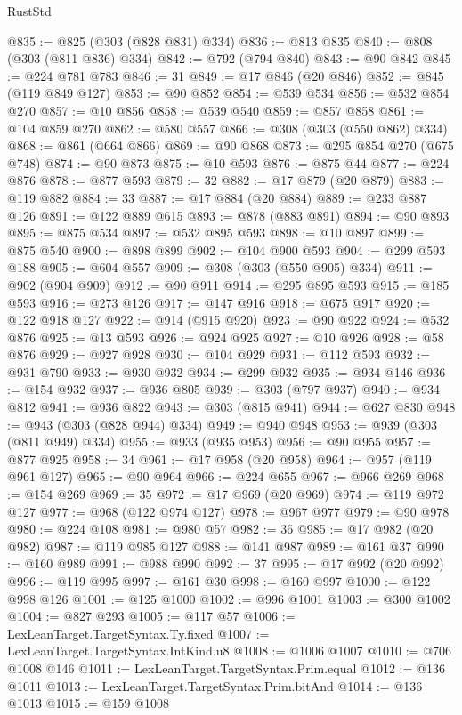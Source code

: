 \begin{lexlean}{RustStd}
\begin{coremodule}
{\begin{coremodule}
{{{{{{{{{{{{{{{{{{{{{{{{{{{{{{{{{{{{{{{{{{{{{{{{{{{{{{{{{{{{{{{{{{{{@835 := @825 (@303 (@828 @831) @334)
@836 := @813 @835
@840 := @808 (@303 (@811 @836) @334)
@842 := @792 (@794 @840)
@843 := @90 @842
@845 := @224 @781 @783
@846 := 31
@849 := @17 @846 (@20 @846)
@852 := @845 (@119 @849 @127)
@853 := @90 @852
@854 := @539 @534
@856 := @532 @854 @270
@857 := @10 @856
@858 := @539 @540
@859 := @857 @858
@861 := @104 @859 @270
@862 := @580 @557
@866 := @308 (@303 (@550 @862) @334)
@868 := @861 (@664 @866)
@869 := @90 @868
@873 := @295 @854 @270 (@675 @748)
@874 := @90 @873
@875 := @10 @593
@876 := @875 @44
@877 := @224 @876
@878 := @877 @593
@879 := 32
@882 := @17 @879 (@20 @879)
@883 := @119 @882
@884 := 33
@887 := @17 @884 (@20 @884)
@889 := @233 @887 @126
@891 := @122 @889 @615
@893 := @878 (@883 @891)
@894 := @90 @893
@895 := @875 @534
@897 := @532 @895 @593
@898 := @10 @897
@899 := @875 @540
@900 := @898 @899
@902 := @104 @900 @593
@904 := @299 @593 @188
@905 := @604 @557
@909 := @308 (@303 (@550 @905) @334)
@911 := @902 (@904 @909)
@912 := @90 @911
@914 := @295 @895 @593
@915 := @185 @593
@916 := @273 @126
@917 := @147 @916
@918 := @675 @917
@920 := @122 @918 @127
@922 := @914 (@915 @920)
@923 := @90 @922
@924 := @532 @876
@925 := @13 @593
@926 := @924 @925
@927 := @10 @926
@928 := @58 @876
@929 := @927 @928
@930 := @104 @929
@931 := @112 @593
@932 := @931 @790
@933 := @930 @932
@934 := @299 @932
@935 := @934 @146
@936 := @154 @932
@937 := @936 @805
@939 := @303 (@797 @937)
@940 := @934 @812
@941 := @936 @822
@943 := @303 (@815 @941)
@944 := @627 @830
@948 := @943 (@303 (@828 @944) @334)
@949 := @940 @948
@953 := @939 (@303 (@811 @949) @334)
@955 := @933 (@935 @953)
@956 := @90 @955
@957 := @877 @925
@958 := 34
@961 := @17 @958 (@20 @958)
@964 := @957 (@119 @961 @127)
@965 := @90 @964
@966 := @224 @655
@967 := @966 @269
@968 := @154 @269
@969 := 35
@972 := @17 @969 (@20 @969)
@974 := @119 @972 @127
@977 := @968 (@122 @974 @127)
@978 := @967 @977
@979 := @90 @978
@980 := @224 @108
@981 := @980 @57
@982 := 36
@985 := @17 @982 (@20 @982)
@987 := @119 @985 @127
@988 := @141 @987
@989 := @161 @37
@990 := @160 @989
@991 := @988 @990
@992 := 37
@995 := @17 @992 (@20 @992)
@996 := @119 @995
@997 := @161 @30
@998 := @160 @997
@1000 := @122 @998 @126
@1001 := @125 @1000
@1002 := @996 @1001
@1003 := @300 @1002
@1004 := @827 @293
@1005 := @117 @57
@1006 := LexLeanTarget.TargetSyntax.Ty.fixed
@1007 := LexLeanTarget.TargetSyntax.IntKind.u8
@1008 := @1006 @1007
@1010 := @706 @1008 @146
@1011 := LexLeanTarget.TargetSyntax.Prim.equal
@1012 := @136 @1011
@1013 := LexLeanTarget.TargetSyntax.Prim.bitAnd
@1014 := @136 @1013
@1015 := @159 @1008
}}}}}}}}}}}}}}}}}}}}}}}}}}}}}}}}}}}}}}}}}}}}}}}}}}}}}}}}}}}}}}}}}}}}
\end{coremodule}}
\end{coremodule}
\end{lexlean}

